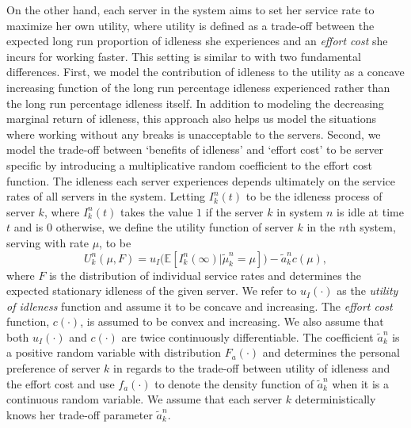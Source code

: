 \documentclass[a4paper,11pt,twoside]{article}
\numberwithin{equation}{section}
\numberwithin{figure}{section}
\theoremstyle{plain}
\newcommand{\EE}{\mathbb{E}}
\newcommand{\1}{\mathbbm{1}}
\begin{document}
On the other hand, each server in the system aims to set her service rate to maximize her own utility, where utility is defined as a trade-off between the expected long run proportion of idleness she experiences and an \emph{effort cost} she incurs for working faster. This setting is similar to \cite{Gopalakrishnan_etal2016} with two fundamental differences. First, we model the contribution of idleness to the utility as a concave increasing function of the long run percentage idleness experienced rather than the long run percentage idleness itself. In addition to modeling the decreasing marginal return of idleness, this approach also helps us model the situations where working without any breaks is unacceptable to the servers. Second, we model the trade-off between `benefits of idleness' and `effort cost' to be server specific by introducing a multiplicative random coefficient to the effort cost function. The idleness each server experiences depends ultimately on the service rates of all servers in the system. 
Letting $I_k^n(t)$ to be the idleness process of server $k$, where $I_k^n(t)$ takes the value $1$ if the server $k$ in system $n$ is idle  at time $t$ and is $0$ otherwise, we define the utility function of server $k$ in the $n$th system, serving with rate $\mu$, to be 
\begin{equation}
    U_k^n(\mu, F) = u_I\big(\EE[I_k^n(\infty)|\tilde{\mu}_k^n=\mu]\big)-\tilde{a}_k^n c(\mu),\label{eq:utility}
\end{equation}
 where $F$ is the distribution of individual service rates and determines the expected stationary idleness of the given server. We refer to $u_I(\cdot)$ as the \textit{utility of idleness} function and assume it to be concave and increasing. The \textit{effort cost} function, $c(\cdot)$, is assumed to be convex and increasing. We also assume that both $u_I(\cdot)$ and $c(\cdot)$ are twice continuously differentiable. The coefficient $\tilde{a}_k^n$ is a positive random variable with distribution $F_a(\cdot)$ and determines the personal preference of server $k$ in regards to the trade-off between utility of idleness and the effort cost and use $f_a(\cdot)$ to denote the density function of $\tilde{a}_k^n$ when it is a continuous random variable.  We assume that each server $k$ deterministically knows her trade-off parameter $\tilde{a}_k^n$.
\end{document}
